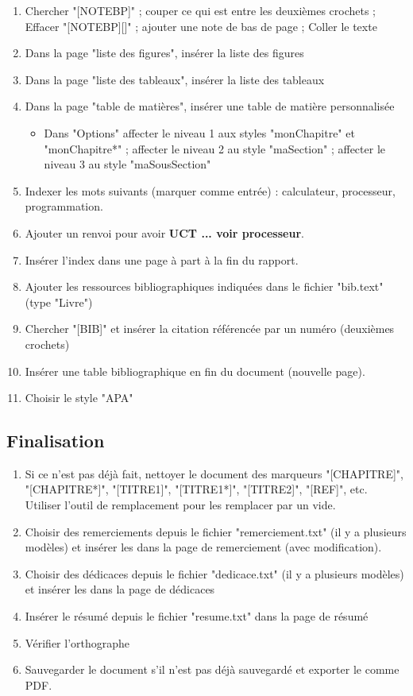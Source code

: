 \documentclass[11pt, a4paper]{article}
\begin{document}
\begin{enumerate}
	\item Chercher "[NOTEBP]" ; couper ce qui est entre les deuxièmes crochets ; Effacer "[NOTEBP][]" ; ajouter une note de bas de page ; Coller le texte 
	\item Dans la page "liste des figures", insérer la liste des figures
	\item Dans la page "liste des tableaux", insérer la liste des tableaux
	\item Dans la page "table de matières", insérer une table de matière personnalisée
	\begin{itemize}
		\item Dans "Options" affecter le niveau 1 aux styles "monChapitre" et "monChapitre*" ; affecter le niveau 2 au style "maSection" ; affecter le niveau 3 au style "maSousSection"
	\end{itemize}
	\item Indexer les mots suivants (marquer comme entrée) : calculateur, processeur, programmation.
	\item Ajouter un renvoi pour avoir \textbf{UCT ... voir processeur}. 
	\item Insérer l'index dans une page à part à la fin du rapport. 
	\item Ajouter les ressources bibliographiques indiquées dans le fichier "bib.text" (type "Livre")
	\item Chercher "[BIB]" et insérer la citation référencée par un numéro (deuxièmes crochets)
	\item Insérer une table bibliographique en fin du document (nouvelle page). 
	\item Choisir le style "APA" 
\end{enumerate}

\subsection*{Finalisation}

\begin{enumerate}
	\item Si ce n'est pas déjà fait, nettoyer le document des marqueurs "[CHAPITRE]", "[CHAPITRE*]", "[TITRE1]", "[TITRE1*]", "[TITRE2]", "[REF]", etc. Utiliser l'outil de remplacement pour les remplacer par un vide. 
	\item Choisir des remerciements depuis le fichier "remerciement.txt" (il y a plusieurs modèles) et insérer les dans la page de remerciement (avec modification). 
	\item Choisir des dédicaces depuis le fichier "dedicace.txt" (il y a plusieurs modèles) et insérer les dans la page de dédicaces
	\item Insérer le résumé depuis le fichier "resume.txt" dans la page de résumé 
	\item Vérifier l'orthographe
	\item Sauvegarder le document s'il n'est pas déjà sauvegardé et exporter le comme PDF.
\end{enumerate}
\end{document}
